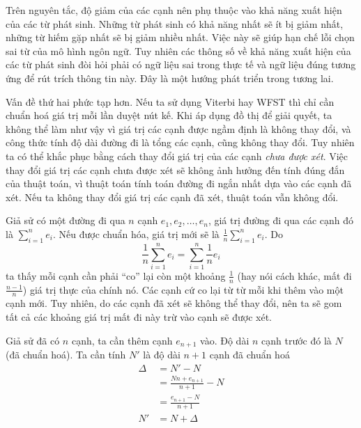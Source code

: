 \documentclass[a4paper,oneside,14pt]{extbook} %
\begin{document}
Trên nguyên tắc, độ giảm của các cạnh nên phụ thuộc vào khả năng xuất
hiện của các từ phát sinh. Những từ phát sinh có khả năng nhất sẽ ít
bị giảm nhất, những từ hiếm gặp nhất sẽ bị giảm nhiều nhất. Việc này
sẽ giúp hạn chế lỗi chọn sai từ của mô hình ngôn ngữ. Tuy nhiên các
thông số về khả năng xuất hiện của các từ phát sinh đòi hỏi phải có ngữ
liệu sai trong thực tế và ngữ liệu đúng tương ứng để rút trích thông
tin này. Đây là một hướng phát triển trong tương lai.

Vấn đề thứ hai phức tạp hơn. Nếu ta sử dụng Viterbi hay
WFST thì chỉ cần chuẩn hoá giá trị mỗi lần duyệt nút kế. Khi áp dụng
đồ thị để giải quyết, ta không thể làm như vậy vì giá trị các cạnh
được ngầm định là không thay đổi, và công thức tính độ dài đường đi là
tổng các cạnh, cũng không thay đổi. Tuy nhiên ta có thể khắc phục bằng
cách thay đổi giá trị của các cạnh {\em chưa được xét}. Việc thay đổi
giá trị các cạnh chưa được xét sẽ không ảnh hưởng đến tính đúng đắn
của thuật toán, vì thuật toán tính toán đường đi ngắn nhất dựa vào các
cạnh đã xét. Nếu ta không thay đổi giá trị các cạnh đã xét, thuật toán
vẫn không đổi.

Giả sử có một đường đi qua $n$ cạnh $e_1,e_2,\ldots,e_n$, giá trị
đường đi qua các cạnh đó là $\sum_{i=1}^{n}e_i$. Nếu được chuẩn hóa,
giá trị mới sẽ là $\frac{1}{n}\sum_{i=1}^{n}e_i$. 
Do $$\frac{1}{n}\sum_{i=1}^{n}e_i=\sum_{i=1}^{n}\frac{1}{n}e_i$$ ta
thấy mỗi cạnh cần phải ``co'' lại còn một khoảng $\frac{1}{n}$ (hay
nói cách khác, mất đi $\frac{n-1}{n}$) giá trị
thực của chính nó. Các cạnh cứ co lại từ từ mỗi khi thêm vào một cạnh
mới. Tuy nhiên, do các cạnh đã xét sẽ không thể thay đổi, nên ta sẽ
gom tất cả các khoảng giá trị mất đi này trừ vào cạnh sẽ được xét.

Giả sử đã có $n$ cạnh, ta cần thêm cạnh $e_{n+1}$ vào. Độ dài $n$ cạnh
trước đó là $N$ (đã chuẩn hoá). Ta cần tính $N'$ là độ dài $n+1$ cạnh đã
chuẩn hoá
\begin{align*}
\Delta&=N'-N\\
      &=\frac{Nn+e_{n+1}}{n+1}-N\\
      &=\frac{e_{n+1}-N}{n+1}\\
N'&=N+\Delta
\end{align*}
\end{document}
